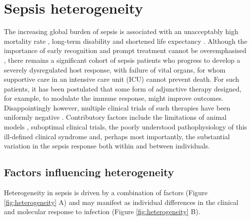 \section{Sepsis heterogeneity}
The increasing global burden of sepsis is associated with an unacceptably high mortality rate \parencite{Vincent2014}, long-term disability \parencite{Barnato2011} and shortened life expectancy \parencite{Cuthbertson2013}. Although the importance of early recognition and prompt treatment cannot be overemphasised \parencite{Seymour2017}, there remains a significant cohort of sepsis patients who progress to develop a severely dysregulated host response, with failure of vital organs, for whom supportive care in an intensive care unit (ICU) cannot prevent death. For such patients, it has been postulated that some form of adjunctive therapy designed, for example, to modulate the immune response, might improve outcomes. Disappointingly however, multiple clinical trials of such therapies have been uniformly negative \parencite{Marshall2014}. Contributory factors include the limitations of animal models \parencite{Buras2005}, suboptimal clinical trials, the poorly understood pathophysiology of this ill-defined clinical syndrome and, perhaps most importantly, the substantial variation in the sepsis response both within and between individuals. 
\subsection{Factors influencing heterogeneity}
Heterogeneity in sepsis is driven by a combination of factors (Figure \ref{fig:heterogeneity} A) and may manifest as individual differences in the clinical and molecular response to infection (Figure \ref{fig:heterogeneity} B). 


